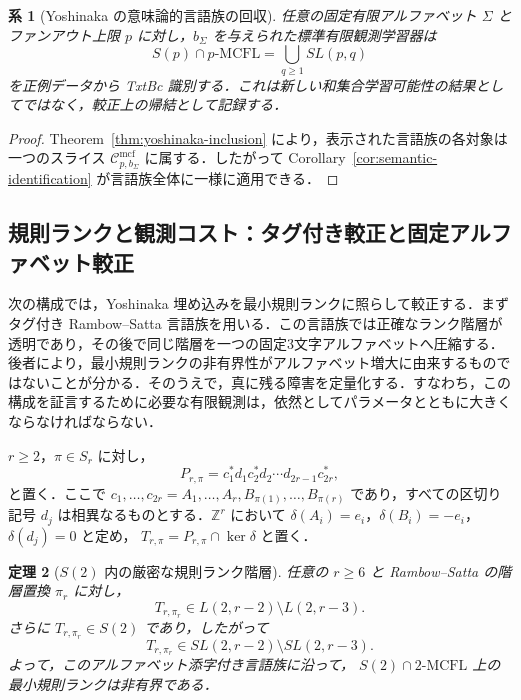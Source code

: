 \documentclass[11pt,a4paper]{ltjsarticle}
\numberwithin{equation}{section}
\theoremstyle{plain}
\newtheorem{theorem}{定理}[section]
\newtheorem{corollary}[theorem]{系}
\theoremstyle{definition}
\theoremstyle{remark}
\newcommand{\Cmcf}[2]{\mathcal{C}^{\mathrm{mcf}}_{#1,#2}}
\begin{document}
\begin{corollary}[Yoshinaka の意味論的言語族の回収]
\label{cor:yoshinaka-full-union-learning}
任意の固定有限アルファベット $\Sigma$ とファンアウト上限 $p$ に対し，$b_\Sigma$ を与えられた標準有限観測学習器は
\[
  S(p)\cap p\text{-}\mathrm{MCFL}
  =\bigcup_{q\ge1}SL(p,q)
\]
を正例データから TxtBc 識別する．これは新しい和集合学習可能性の結果としてではなく，較正上の帰結として記録する．
\end{corollary}

\begin{proof}
Theorem~\ref{thm:yoshinaka-inclusion} により，表示された言語族の各対象は一つのスライス $\Cmcf{p}{b_\Sigma}$ に属する．したがって Corollary~\ref{cor:semantic-identification} が言語族全体に一様に適用できる．
\end{proof}

\subsection{規則ランクと観測コスト：タグ付き較正と固定アルファベット較正}
\label{subsec:rank-observation-calibration}

次の構成では，Yoshinaka 埋め込みを最小規則ランクに照らして較正する．まずタグ付き Rambow--Satta 言語族を用いる．この言語族では正確なランク階層が透明であり，その後で同じ階層を一つの固定3文字アルファベットへ圧縮する．後者により，最小規則ランクの非有界性がアルファベット増大に由来するものではないことが分かる．そのうえで，真に残る障害を定量化する．すなわち，この構成を証言するために必要な有限観測は，依然としてパラメータとともに大きくならなければならない．

$r\ge2$，$\pi\in S_r$ に対し，
\[
 P_{r,\pi}=c_1^*d_1c_2^*d_2\cdots d_{2r-1}c_{2r}^*,
\]
と置く．ここで
$c_1,\ldots,c_{2r}=A_1,\ldots,A_r,B_{\pi(1)},\ldots,B_{\pi(r)}$
であり，すべての区切り記号 $d_j$ は相異なるものとする．$\mathbb Z^r$ において
$\delta(A_i)=e_i$，$\delta(B_i)=-e_i$，$\delta(d_j)=0$ と定め，
$T_{r,\pi}=P_{r,\pi}\cap\ker\delta$ と置く．

\begin{theorem}[$S(2)$ 内の厳密な規則ランク階層]
\label{thm:s2-rank-hierarchy}
任意の $r\ge6$ と Rambow--Satta の階層置換 $\pi_r$ に対し，
\[
  T_{r,\pi_r}\in L(2,r-2)\setminus L(2,r-3).
\]
さらに $T_{r,\pi_r}\in S(2)$ であり，したがって
\[
  T_{r,\pi_r}\in SL(2,r-2)\setminus SL(2,r-3).
\]
よって，このアルファベット添字付き言語族に沿って，
$S(2)\cap2\text{-}\mathrm{MCFL}$ 上の最小規則ランクは非有界である．
\end{theorem}
\end{document}

